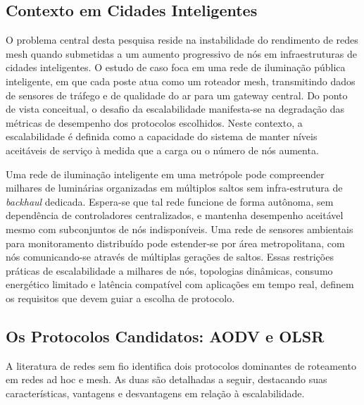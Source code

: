 \documentclass[12pt]{article}
\begin{document}
\subsection{Contexto em Cidades Inteligentes}

O problema central desta pesquisa reside na instabilidade do rendimento de redes mesh quando submetidas a um aumento progressivo de nós em infraestruturas de cidades inteligentes. O estudo de caso foca em uma rede de iluminação pública inteligente, em que cada poste atua como um roteador mesh, transmitindo dados de sensores de tráfego e de qualidade do ar para um gateway central. Do ponto de vista conceitual, o desafio da escalabilidade manifesta-se na degradação das métricas de desempenho dos protocolos escolhidos. Neste contexto, a escalabilidade é definida como a capacidade do sistema de manter níveis aceitáveis de serviço à medida que a carga ou o número de nós aumenta. 


Uma rede de iluminação inteligente em uma metrópole pode compreender milhares de luminárias organizadas em múltiplos saltos sem infra-estrutura de \textit{backhaul} dedicada. Espera-se que tal rede funcione de forma autônoma, sem dependência de controladores centralizados, e mantenha desempenho aceitável mesmo com subconjuntos de nós indisponíveis. Uma rede de sensores ambientais para monitoramento distribuído pode estender-se por área metropolitana, com nós comunicando-se através de múltiplas gerações de saltos. Essas restrições práticas de escalabilidade a milhares de nós, topologias dinâmicas, consumo energético limitado e latência compatível com aplicações em tempo real, definem os requisitos que devem guiar a escolha de protocolo.

\subsection{Os Protocolos Candidatos: AODV e OLSR}

A literatura de redes sem fio identifica dois protocolos dominantes de roteamento em redes ad hoc e mesh. As duas são detalhadas a seguir, destacando suas características, vantagens e desvantagens em relação à escalabilidade.
\end{document}
